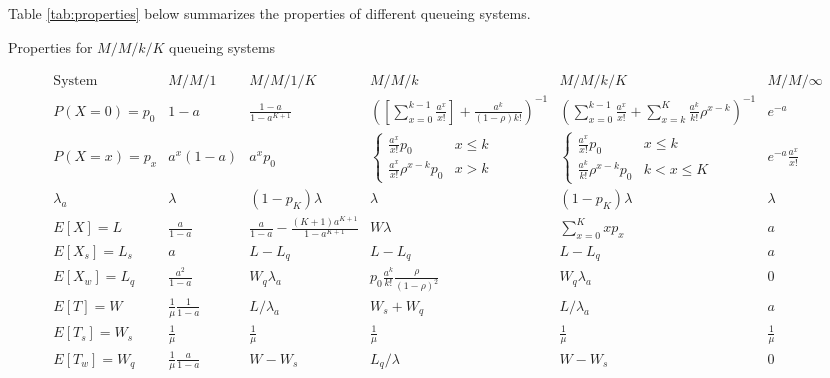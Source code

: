 \documentclass{article}
\renewcommand{\alpha}{a} %
\begin{document}
Table \ref{tab:properties} below summarizes the properties of different queueing systems.

\begin{table}[h]
\caption{Properties for $M/M/k/K$ queueing systems}
\label{tab:properties}
\[ \begin{array}{c|ccccc}
\mbox{System} & M/M/1 & M/M/1/K & M/M/k & M/M/k/K & M/M/\infty \\
\hline
P(X=0)=p_0 & 1-\alpha & \frac{1-\alpha}{1-\alpha^{K+1}} & \left(\left[\sum_{x=0}^{k-1} \frac{\alpha^x}{x!}\right] + \frac{\alpha^k}{(1-\rho)k!}\right)^{-1} &
\left(\sum_{x=0}^{k-1} \frac{\alpha^x}{x!} + \sum_{x=k}^K \frac{\alpha^k}{k!}\rho^{x-k} \right)^{-1} 
& e^{-\alpha} \\
P(X=x)=p_x & \alpha^x (1-\alpha) & a^x p_0 & \left\{ \begin{array}{ll} \frac{\alpha^x}{x!}p_0 & x\le k \\ \frac{\alpha^x}{x!} \rho^{x-k}p_0 & x>k \end{array} \right. 
& \left\{ \begin{array}{ll} \frac{\alpha^x}{x!}p_0 & x\le k \\ \frac{\alpha^k}{k!} \rho ^{x-k}p_0 & k<x\le K \end{array} \right.   & e^{-\alpha} \frac{\alpha^x}{x!} \\
\hline
\lambda_a & \lambda & (1-p_K)\lambda & \lambda & (1-p_K)\lambda & \lambda \\
\hline
E[X]=L & \frac{\alpha}{1-\alpha} & \frac{\alpha}{1-\alpha} - \frac{(K+1)\alpha^{K+1}}{1-\alpha^{K+1}} & W\lambda & \sum_{x=0}^K x p_x & \alpha \\
E[X_s]=L_s & \alpha & L-L_q & L-L_q & L-L_q & a \\
E[X_w]=L_q & \frac{\alpha^2}{1-\alpha} & W_q \lambda_a & p_0 \frac{a^k}{k!} \frac{\rho}{(1-\rho)^2} & W_q \lambda_a& 0 \\
E[T]=W & \frac{1}{\mu}\frac{1}{1-\alpha} & L/\lambda_a & W_s+W_q & L/\lambda_a& \alpha \\
E[T_s]=W_s & \frac{1}{\mu} & \frac{1}{\mu} & \frac{1}{\mu} & \frac{1}{\mu} & \frac{1}{\mu} \\
E[T_w]=W_q & \frac{1}{\mu}\frac{\alpha}{1-\alpha} & W-W_s & L_q / \lambda  & W-W_s& 0 \\
\end{array} \]
\end{table}
\end{document}
